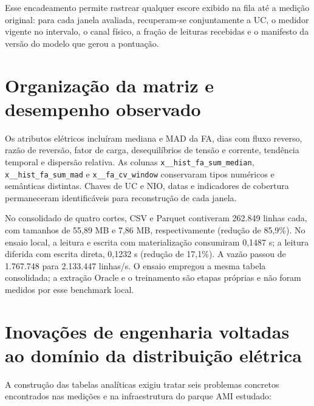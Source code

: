 Esse encadeamento permite rastrear qualquer escore exibido na fila até a medição original: para cada janela avaliada, recuperam-se conjuntamente a UC, o medidor vigente no intervalo, o canal físico, a fração de leituras recebidas e o manifesto da versão do modelo que gerou a pontuação.


\section{Organização da matriz e desempenho observado}
Os atributos elétricos incluíram mediana e MAD da FA, dias com fluxo reverso, razão de reversão, fator de carga, desequilíbrios de tensão e corrente, tendência temporal e dispersão relativa. As colunas \texttt{x\_\_hist\_fa\_sum\_median}, \texttt{x\_\_hist\_fa\_sum\_mad} e \texttt{x\_\_fa\_cv\_window} conservaram tipos numéricos e semânticas distintas. Chaves de UC e NIO, datas e indicadores de cobertura permaneceram identificáveis para reconstrução de cada janela.

No consolidado de quatro cortes, CSV e Parquet contiveram 262.849 linhas cada, com tamanhos de 55,89 MB e 7,86 MB, respectivamente (redução de 85,9\%). No ensaio local, a leitura e escrita com materialização consumiram 0,1487 s; a leitura diferida com escrita direta, 0,1232 s (redução de 17,1\%). A vazão passou de 1.767.748 para 2.133.447 linhas/s. O ensaio empregou a mesma tabela consolidada; a extração Oracle e o treinamento são etapas próprias e não foram medidos por esse benchmark local.

\section{Inovações de engenharia voltadas ao domínio da distribuição elétrica}\label{inovacoes-engenharia-dominio}

A construção das tabelas analíticas exigiu tratar seis problemas concretos encontrados nas medições e na infraestrutura do parque AMI estudado:

